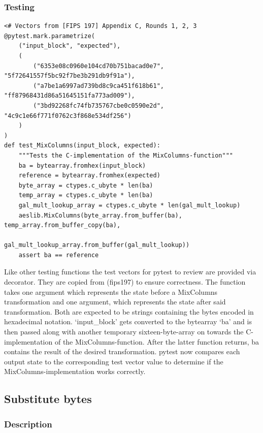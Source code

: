 \hypertarget{testing-4}{%
\subsubsection{Testing}\label{testing-4}}

\begin{lstlisting}
<# Vectors from [FIPS 197] Appendix C, Rounds 1, 2, 3
@pytest.mark.parametrize(
    ("input_block", "expected"),
    (
        ("6353e08c0960e104cd70b751bacad0e7", "5f72641557f5bc92f7be3b291db9f91a"),
        ("a7be1a6997ad739bd8c9ca451f618b61", "ff87968431d86a51645151fa773ad009"),
        ("3bd92268fc74fb735767cbe0c0590e2d", "4c9c1e66f771f0762c3f868e534df256")
    )
)
def test_MixColumns(input_block, expected):
    """Tests the C-implementation of the MixColumns-function"""
    ba = bytearray.fromhex(input_block)
    reference = bytearray.fromhex(expected)
    byte_array = ctypes.c_ubyte * len(ba)
    temp_array = ctypes.c_ubyte * len(ba)
    gal_mult_lookup_array = ctypes.c_ubyte * len(gal_mult_lookup)
    aeslib.MixColumns(byte_array.from_buffer(ba), temp_array.from_buffer_copy(ba),
                      gal_mult_lookup_array.from_buffer(gal_mult_lookup))
    assert ba == reference
\end{lstlisting}

Like other testing functions the test vectors for pytest to review are
provided via decorator. They are copied from (fips197) to ensure
correctness. The function takes one argument which represents the state
before a MixColumns transformation and one argument, which represents
the state after said transformation. Both are expected to be strings
containing the bytes encoded in hexadecimal notation. `input\_block'
gets converted to the bytearray `ba' and is then passed along with
another temporary sixteen-byte-array on towards the C-implementation of
the MixColumns-function. After the latter function returns, ba contains
the result of the desired transformation. pytest now compares each
output state to the corresponding test vector value to determine if the
MixColumns-implementation works correctly.

\hypertarget{substitute-bytes}{%
\subsection{Substitute bytes}\label{substitute-bytes}}

\hypertarget{description-5}{%
\subsubsection{Description}\label{description-5}}

